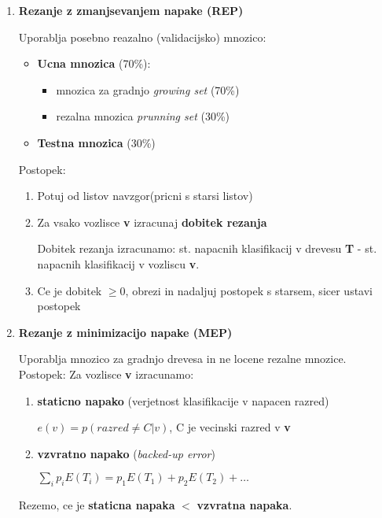 \documentclass{article}
\begin{document}
\begin{multicols}{2}
\begin{enumerate}
  \item \textbf{Rezanje z zmanjsevanjem napake (REP)}

    Uporablja posebno reazalno (validacijsko) mnozico:
      \begin{itemize}
        \item \textbf{Ucna mnozica} (70\%):
          \begin{itemize}
            \item mnozica za gradnjo \textit{growing set} (70\%)
            \item rezalna mnozica \textit{prunning set} (30\%)
          \end{itemize}
        \item \textbf{Testna mnozica} (30\%)
      \end{itemize}
    Postopek:
    \begin{enumerate}
      \item Potuj od listov navzgor(pricni s starsi listov)
      \item Za vsako vozlisce \textbf{v} izracunaj \textbf{dobitek rezanja}
          
        Dobitek rezanja izracunamo: st. napacnih klasifikacij v drevesu \textbf{T} - st. napacnih klasifikacij v vozliscu \textbf{v}.
      \item Ce je dobitek $\geq 0$, obrezi in nadaljuj postopek s starsem, sicer ustavi postopek 
    \end{enumerate}
  \item \textbf{Rezanje z minimizacijo napake (MEP)}

  Uporablja mnozico za gradnjo drevesa in ne locene rezalne mnozice.
  Postopek: Za vozlisce \textbf{v} izracunamo:
  \begin{enumerate}
    \item \textbf{staticno napako} (verjetnost klasifikacije v napacen razred)
      \begin{center}
        \begin{math}
          e(v) = p(razred \neq C | v)
        \end{math},
        C je vecinski razred v \textbf{v}
      \end{center}
    \item \textbf{vzvratno napako} (\textit{backed-up error})
      \begin{center}
        \begin{math}
          \sum_i p_i E(T_i) = p_1 E(T_1) + p_2 E(T_2) + \dots
        \end{math}
      \end{center}
  \end{enumerate}
  Rezemo, ce je \textbf{staticna napaka} $<$ \textbf{vzvratna napaka}.
  

\end{enumerate}
\end{multicols}
\end{document}
